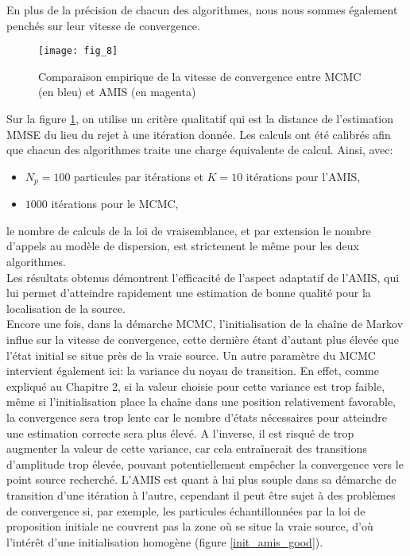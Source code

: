 { En plus de la précision de chacun des algorithmes, nous nous sommes également penchés sur leur vitesse de convergence. \\
 
 \begin{figure}[h!]
 	\centering
 	\texttt{[image: fig\_8]}
 	\caption{Comparaison empirique de la vitesse de convergence entre MCMC (en bleu) et AMIS (en magenta)}
 	\label{fig_8_AE} 	
 \end{figure}

 Sur la figure \ref{fig_8_AE}, on utilise un critère qualitatif qui est la distance de l'estimation MMSE du lieu du rejet à une itération donnée. Les calculs ont été calibrés afin que chacun des algorithmes traite une charge équivalente de calcul. Ainsi, avec:
 \begin{itemize}
 	\item $N_p=100$ particules par itérations et $K=10$ itérations pour l'AMIS,
 	\item $1000$ itérations pour le MCMC,
 \end{itemize} 
 le nombre de calculs de la loi de vraisemblance, et par extension le nombre d'appels au modèle de dispersion, est strictement le même pour les deux algorithmes. \\
 
 Les résultats obtenus démontrent l'efficacité de l'aspect adaptatif de l'AMIS, qui lui permet d'atteindre rapidement une estimation de bonne qualité pour la localisation de la source.\\
 
 Encore une fois, dans la démarche MCMC, l'initialisation de la chaîne de Markov influe sur la vitesse de convergence, cette dernière étant d'autant plus élevée que l'état initial se situe près de la vraie source. Un autre paramètre du MCMC intervient également ici: la variance du noyau de transition. En effet, comme expliqué au Chapitre 2, si la valeur choisie pour cette variance est trop faible, même si l'initialisation place la chaîne dans une position relativement favorable, la convergence sera trop lente car le nombre d'états nécessaires pour atteindre une estimation correcte sera plus élevé. A l'inverse, il est risqué de trop augmenter la valeur de cette variance, car cela entraînerait des transitions d'amplitude trop élevée, pouvant potentiellement empêcher la convergence vers le point source recherché. L'AMIS est quant à lui plus souple dans sa démarche de transition d'une itération à l'autre, cependant il peut être sujet à des problèmes de convergence si, par exemple, les particules échantillonnées par la loi de proposition initiale ne couvrent pas la zone où se situe la vraie source, d'où l'intérêt d'une initialisation homogène (figure \ref{init_amis_good}).\\
 
}
